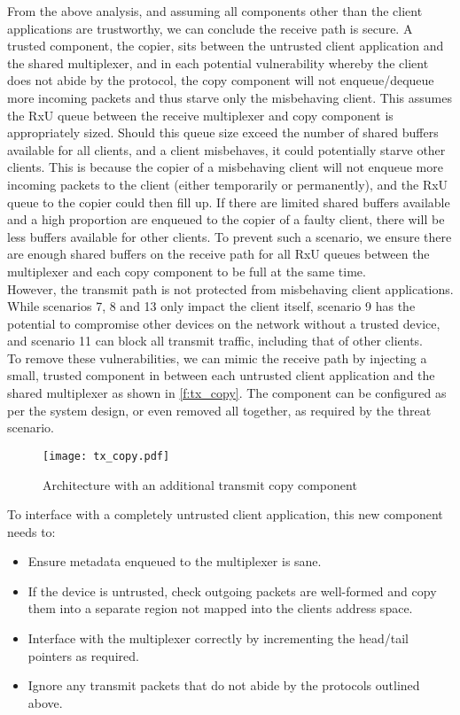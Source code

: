 From the above analysis, and assuming all components other than the client applications are trustworthy,
we can conclude the receive path is secure. A trusted component, the copier, sits between the untrusted client application
and the shared multiplexer, and in each potential vulnerability whereby the client does not abide by the protocol, the copy component
will not enqueue/dequeue more incoming packets and thus starve only the misbehaving client. This assumes the RxU queue between 
the receive multiplexer and copy component is appropriately sized. Should this queue size exceed the number of shared buffers
available for all clients, and a client misbehaves, it could potentially starve other clients. This is because the copier
of a misbehaving client will not enqueue more incoming packets to the client (either temporarily or permanently), and the RxU queue
to the copier could then fill up. If there are limited shared buffers available and a high proportion are enqueued to the copier
of a faulty client, there will be less buffers available for other clients. To prevent such a scenario, we ensure there are enough
shared buffers on the receive path for all RxU queues between the multiplexer and each copy component to be full at the same time.\\

However, the transmit path is not protected from misbehaving client applications. While scenarios 7, 8 and 13 only impact the client
itself, scenario 9 has the potential to compromise other devices on the network without a trusted device, and scenario 11 can block
all transmit traffic, including that of other clients.\\

To remove these vulnerabilities, we can mimic the receive path by injecting a small, trusted component in between each untrusted
client application and the shared multiplexer as shown in \autoref{f:tx_copy}. The component can be configured as
per the system design, or even removed all together, as required by the threat scenario.

\begin{figure}[h]
    \centering
    \texttt{[image: tx\_copy.pdf]}
    \caption{Architecture with an additional transmit copy component}
    \label{f:tx_copy}
\end{figure}

To interface with a completely untrusted client application, this new component needs to:
\begin{itemize}
    \item Ensure metadata enqueued to the multiplexer is sane.
    \item If the device is untrusted, check outgoing packets are well-formed and copy them into a separate region not mapped
          into the clients address space.
    \item Interface with the multiplexer correctly by incrementing the head/tail pointers as required.
    \item Ignore any transmit packets that do not abide by the protocols outlined above.
\end{itemize}

